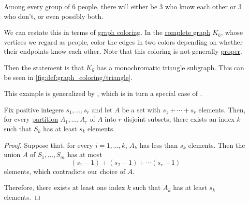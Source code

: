 \begin{example}\label{ex:ramsey_party_problem}
  Among every group of \( 6 \) people, there will either be \( 3 \) who know each other or \( 3 \) who don't, or even possibly both.

  We can restate this in terms of \hyperref[def:graph_coloring]{graph coloring}. In the \hyperref[def:complete_graph]{complete graph} \( K_6 \), whose vertices we regard as people, color the edges in two colors depending on whether their endpoints know each other. Note that this coloring is not generally \hyperref[def:graph_coloring/proper]{proper}.

  Then the statement is that \( K_6 \) has a \hyperref[def:set_coloring/monochromatic]{monochromatic} \hyperref[def:triangle_graph]{triangle subgraph}. This can be seen in \cref{fig:def:graph_coloring/triangle}.

  This example is generalized by , which is in turn a special case of .
\end{example}

\begin{lemma}\label{thm:ramsey_number_lemma}
  Fix positive integers \( s_1, \ldots, s_r \) and let \( A \) be a set with \( s_1 + \cdots + s_r \) elements. Then, for every \hyperref[def:set_partition]{partition} \( A_1, \ldots, A_r \) of \( A \) into \( r \) disjoint subsets, there exists an index \( k \) such that \( S_k \) has at least \( s_k \) elements.
\end{lemma}
\begin{proof}
  Suppose that, for every \( i = 1, \ldots, k \), \( A_k \) has less than \( s_k \) elements. Then the union \( A \) of \( S_1, \ldots, S_m \) has at most
  \begin{equation*}
    (s_1 - 1) + (s_2 - 1) + \cdots (s_r - 1)
  \end{equation*}
  elements, which contradicts our choice of \( A \).

  Therefore, there exists at least one index \( k \) such that \( A_k \) has at least \( s_k \) elements.
\end{proof}

